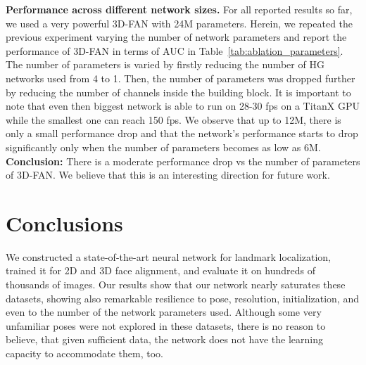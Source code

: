 	\textbf{Performance across different network sizes.} For all reported results so far, we used a very powerful 3D-FAN with 24M parameters. Herein, we repeated the previous experiment varying the number of network parameters and report the performance of 3D-FAN in terms of AUC in Table~\ref{tab:ablation_parameters}. The number of parameters is varied by firstly reducing the number of HG networks used from 4 to 1. Then, the number of parameters was dropped further by reducing the number of channels inside the building block. It is important to note that even then biggest network is able to run on 28-30 fps on a TitanX GPU while the smallest one can reach 150 fps. We observe that up to 12M, there is only a small performance drop and that the network's performance starts to drop significantly only when the number of parameters becomes as low as 6M.   
	\textbf{Conclusion:} There is a moderate performance drop vs the number of parameters of 3D-FAN. We believe that this is an interesting direction for future work.

	\section{Conclusions}

	We constructed a state-of-the-art neural network for landmark localization, trained it for 2D and 3D face alignment, and evaluate it on hundreds of thousands of images. Our results show that our network nearly saturates these datasets, showing also remarkable resilience to pose, resolution, initialization, and even to the number of the network parameters used. Although some very unfamiliar poses were not explored in these datasets, there is no reason to believe, that given sufficient data, the network does not have the learning capacity to accommodate them, too.


